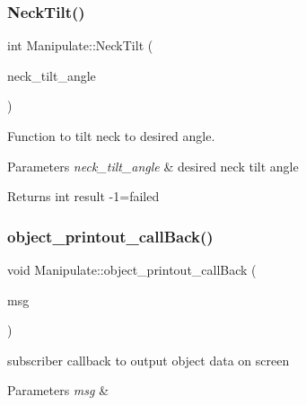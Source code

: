 \subsubsection{\texorpdfstring{Neck\+Tilt()}{NeckTilt()}}
{\footnotesize\ttfamily int Manipulate\+::\+Neck\+Tilt (\begin{DoxyParamCaption}\item[{double}]{neck\+\_\+tilt\+\_\+angle }\end{DoxyParamCaption})\hspace{0.3cm}{\ttfamily [private]}}



Function to tilt neck to desired angle. 


\begin{DoxyParams}{Parameters}
{\em neck\+\_\+tilt\+\_\+angle} & desired neck tilt angle \\
\hline
\end{DoxyParams}
\begin{DoxyReturn}{Returns}
int result -\/1=failed 
\end{DoxyReturn}
\mbox{\label{structManipulate_a85f27b19ae91a8829d0864fb2a0329c2}} 
\subsubsection{\texorpdfstring{object\+\_\+printout\+\_\+call\+Back()}{object\_printout\_callBack()}}
{\footnotesize\ttfamily void Manipulate\+::object\+\_\+printout\+\_\+call\+Back (\begin{DoxyParamCaption}\item[{const geometry\+\_\+msgs\+::\+Pose\+Array\+::\+Ptr \&}]{msg }\end{DoxyParamCaption})\hspace{0.3cm}{\ttfamily [private]}}



subscriber callback to output object data on screen 


\begin{DoxyParams}{Parameters}
{\em msg} & \\
\hline
\end{DoxyParams}
\mbox{\label{structManipulate_a7d9d1528dc39485735d019244b0a7fca}} 
